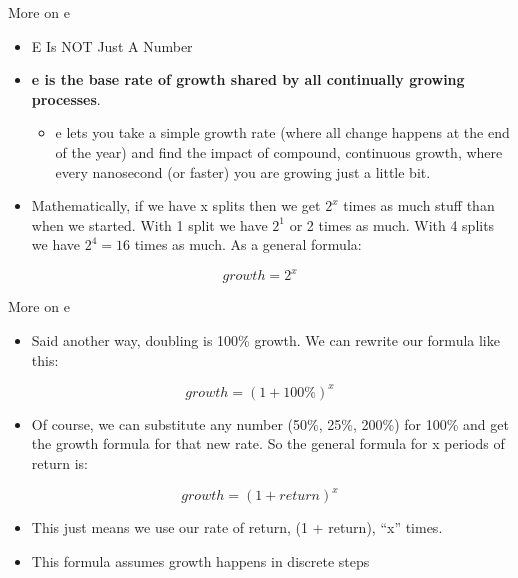 \documentclass[
  ignorenonframetext,
]{beamer}
\providecommand{\tightlist}{%
  \setlength{\itemsep}{0pt}\setlength{\parskip}{0pt}}
\begin{document}
\begin{frame}{More on e}
\protect\hypertarget{more-on-e}{}

\begin{itemize}
\item
  E Is NOT Just A Number
\item
  \textbf{e is the base rate of growth shared by all continually growing
  processes}.

  \begin{itemize}
  \tightlist
  \item
    e lets you take a simple growth rate (where all change happens at
    the end of the year) and find the impact of compound, continuous
    growth, where every nanosecond (or faster) you are growing just a
    little bit.
  \end{itemize}
\item
  Mathematically, if we have x splits then we get \(2^{x}\) times as
  much stuff than when we started. With 1 split we have \(2^{1}\) or 2
  times as much. With 4 splits we have \(2^{4} = 16\) times as much. As
  a general formula:
\end{itemize}

\[\displaystyle{ growth = 2^x }\]

\end{frame}

\begin{frame}{More on e}
\protect\hypertarget{more-on-e-1}{}

\begin{itemize}
\tightlist
\item
  Said another way, doubling is 100\% growth. We can rewrite our formula
  like this:
\end{itemize}

\[\displaystyle{ growth = (1 + 100\%)^x}\]

\begin{itemize}
\tightlist
\item
  Of course, we can substitute any number (50\%, 25\%, 200\%) for 100\%
  and get the growth formula for that new rate. So the general formula
  for x periods of return is:
\end{itemize}

\[\displaystyle{growth = (1 + return)^x}\]

\begin{itemize}
\item
  This just means we use our rate of return, (1 + return), ``x'' times.
\item
  This formula assumes growth happens in discrete steps
\end{itemize}

\end{frame}
\end{document}
